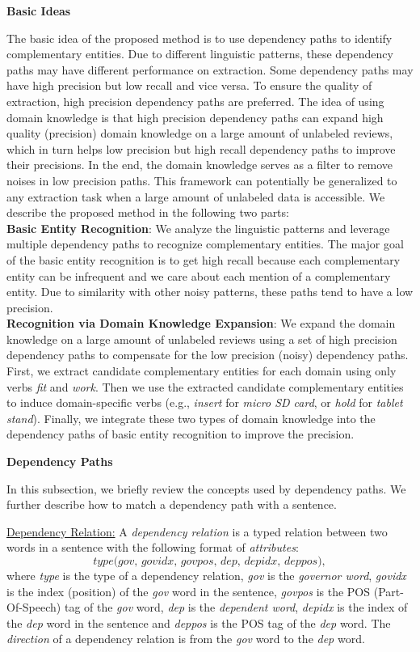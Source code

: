 \textbf{Basic Ideas}

The basic idea of the proposed method is to use dependency paths to identify complementary entities. Due to different linguistic patterns, these dependency paths may have different performance on extraction. Some dependency paths may have high precision but low recall and vice versa. To ensure the quality of extraction, high precision dependency paths are preferred. The idea of using domain knowledge is that high precision dependency paths can expand high quality (precision) domain knowledge on a large amount of unlabeled reviews, which in turn helps low precision but high recall dependency paths to improve their precisions. In the end, the domain knowledge serves as a filter to remove noises in low precision paths. This framework can potentially be generalized to any extraction task when a large amount of unlabeled data is accessible. We describe the proposed method in the following two parts:\\
\textbf{Basic Entity Recognition}: We analyze the linguistic patterns and leverage multiple dependency paths to recognize complementary entities. The major goal of the basic entity recognition is to get high recall because each complementary entity can be infrequent and we care about each mention of a complementary entity. Due to similarity with other noisy patterns, these paths tend to have a low precision.\\
\textbf{Recognition via Domain Knowledge Expansion}: We expand the domain knowledge on a large amount of unlabeled reviews using a set of high precision dependency paths to compensate for the low precision (noisy) dependency paths. First, we extract candidate complementary entities for each domain using only verbs \textit{fit} and \textit{work}. Then we use the extracted candidate complementary entities to induce domain-specific verbs (e.g., \textit{insert} for \textit{micro SD card}, or \textit{hold} for \textit{tablet stand}). Finally, we integrate these two types of domain knowledge into the dependency paths of basic entity recognition to improve the precision.

\textbf{Dependency Paths}

In this subsection, we briefly review the concepts used by dependency paths. We further describe how to match a dependency path with a sentence.
 
\underline{Dependency Relation:} \label{defn:dr} 
A \textit{dependency relation} is a typed relation between two words in a sentence with the following format of \emph{attributes}: 
$$\textit{type(gov, govidx, govpos, dep, depidx, deppos)}, $$
where \textit{type} is the type of a dependency relation, \textit{gov} is the \emph{governor word}, \textit{govidx} is the index (position) of the \textit{gov} word in the sentence, \textit{govpos} is the POS (Part-Of-Speech) tag of the \textit{gov} word, \textit{dep} is the \emph{dependent word}, \textit{depidx} is the index of the \textit{dep} word in the sentence and \textit{deppos} is the POS tag of the \textit{dep} word. The \emph{direction} of a dependency relation is from the \textit{gov} word to the \textit{dep} word.

